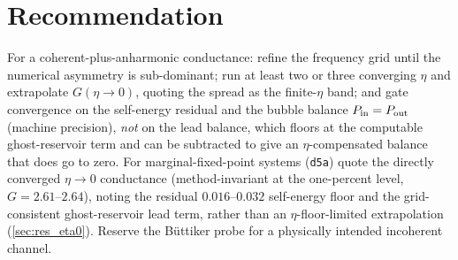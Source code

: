 \section{Recommendation}
\label{sec:cons_recommendation}

For a coherent-plus-anharmonic conductance: refine the frequency grid until the
numerical asymmetry is sub-dominant; run at least two or three converging
$\eta$ and extrapolate $G(\eta\to0)$, quoting the spread as the finite-$\eta$
band; and gate convergence on the self-energy residual and the bubble balance
$P_{\rm in}=P_{\rm out}$ (machine precision), \emph{not} on the lead balance,
which floors at the computable ghost-reservoir term and can be subtracted to
give an $\eta$-compensated balance that does go to zero. For marginal-fixed-point
systems (\texttt{d5a}) quote the directly converged $\eta\to0$ conductance
(method-invariant at the one-percent level, $G=2.61$--$2.64$), noting the residual
$0.016$--$0.032$ self-energy floor and the grid-consistent ghost-reservoir lead
term, rather than an $\eta$-floor-limited extrapolation (\cref{sec:res_eta0}).
Reserve the B\"uttiker probe for a physically intended incoherent channel.
